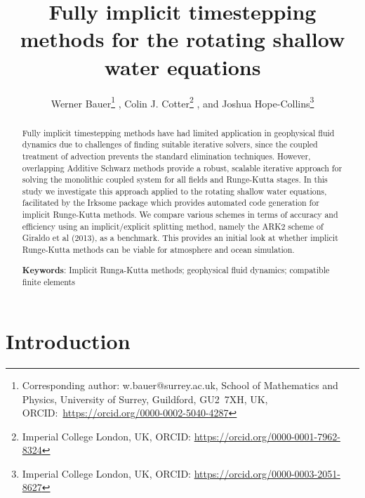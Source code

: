 \documentclass[a4paper, 12pt]{article}
\title{Fully implicit timestepping methods for the rotating shallow water equations}
\author{Werner Bauer\footnote{Corresponding author:
w.bauer@surrey.ac.uk,
School of Mathematics and Physics,
University of Surrey,
Guildford, GU2~7XH, UK,
ORCID:~\href{https://orcid.org/0000-0002-5040-4287}{https://orcid.org/0000-0002-5040-4287}
}
 ,
Colin J. Cotter\footnote{Imperial College London, UK, ORCID:
\href{https://orcid.org/0000-0001-7962-8324}{https://orcid.org/0000-0001-7962-8324}}
, and
Joshua Hope-Collins\footnote{Imperial College London, UK, ORCID:
\href{https://orcid.org/0000-0003-2051-8627}{https://orcid.org/0000-0003-2051-8627}}
}
\begin{document}
\maketitle

\begin{abstract}
  
Fully implicit timestepping methods have had limited application in
geophysical fluid dynamics due to challenges of finding suitable
iterative solvers, since the coupled treatment of advection prevents
the standard elimination techniques. However, overlapping Additive
Schwarz methods provide a robust, scalable iterative approach for
solving the monolithic coupled system for all fields and Runge-Kutta
stages.
In this study we investigate this approach applied to the rotating
shallow water equations, facilitated by the Irksome package which
provides automated code generation for implicit Runge-Kutta
methods. We compare various schemes in terms of accuracy and
efficiency using an implicit/explicit splitting method, namely the
ARK2 scheme of Giraldo et al (2013), as a benchmark. {This provides an
initial look at whether implicit Runge-Kutta methods can be viable for
atmosphere and ocean simulation.}

\smallskip
\noindent
\textbf{Keywords}: Implicit Runga-Kutta methods;
geophysical fluid dynamics;
compatible finite elements




\end{abstract}

\section{Introduction}
\end{document}
